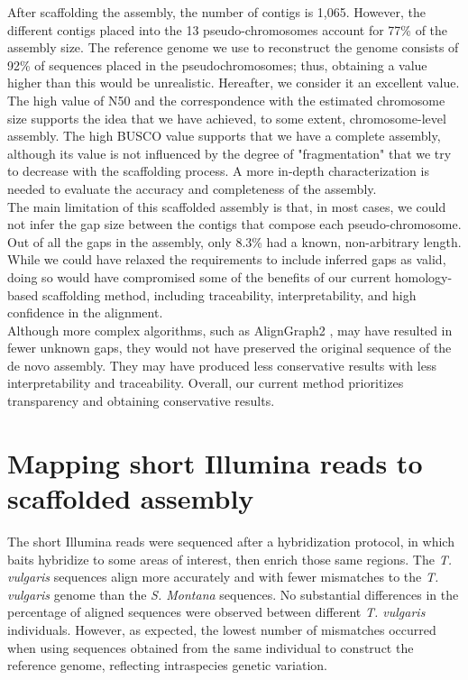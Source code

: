After scaffolding the assembly, the number of contigs is 1,065. However, the different contigs placed into the 13 pseudo-chromosomes account for  77\% of the assembly size. The reference genome we use to reconstruct the genome consists of 92\% of sequences placed in the pseudochromosomes; thus, obtaining a value higher than this would be unrealistic. Hereafter, we consider it an excellent value. \\

The high value of N50 and the correspondence with the estimated chromosome size supports the idea that we have achieved, to some extent, chromosome-level assembly. The high BUSCO value supports that we have a complete assembly, although its value is not influenced by the degree of "fragmentation" that we try to decrease with the scaffolding process. A more in-depth characterization is needed to evaluate the accuracy and completeness of the assembly.  \\

The main limitation of this scaffolded assembly is that, in most cases, we could not infer the gap size between the contigs that compose each pseudo-chromosome. Out of all the gaps in the assembly, only 8.3\% had a known, non-arbitrary length. While we could have relaxed the requirements to include inferred gaps as valid, doing so would have compromised some of the benefits of our current homology-based scaffolding method, including traceability, interpretability, and high confidence in the alignment.\\

Although more complex algorithms, such as AlignGraph2 \cite{huangAlignGraph2SimilarGenomeassisted2021}, may have resulted in fewer unknown gaps, they would not have preserved the original sequence of the de novo assembly. They may have produced less conservative results with less interpretability and traceability. Overall, our current method prioritizes transparency and obtaining conservative results.\\

\section*{Mapping short Illumina reads to scaffolded assembly}

The short Illumina reads were sequenced after a hybridization protocol, in which baits hybridize to some areas of interest, then enrich those same regions. The \textit{T. vulgaris} sequences align more accurately and with fewer mismatches to the \textit{T. vulgaris} genome than the \textit{S. Montana} sequences. No substantial differences in the percentage of aligned sequences were observed between different \textit{T. vulgaris} individuals. However, as expected, the lowest number of mismatches occurred when using sequences obtained from the same individual to construct the reference genome, reflecting intraspecies genetic variation.\\

